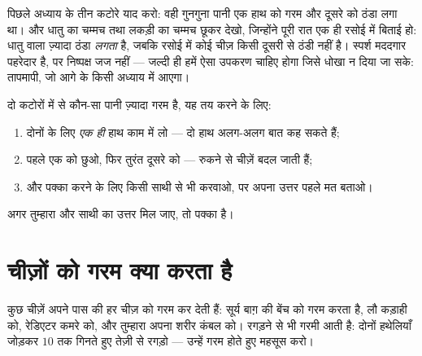 \begin{remark}[स्पर्श धोखा खा सकता है]\label{rem:g1:hot-and-cold:fooled}
पिछले अध्याय के तीन कटोरे याद करो: वही गुनगुना पानी एक हाथ को गरम और
दूसरे को ठंडा लगा था। और धातु का चम्मच तथा लकड़ी का चम्मच छूकर देखो,
जिन्होंने पूरी रात एक ही रसोई में बिताई हो: धातु वाला ज़्यादा ठंडा
\emph{लगता} है, जबकि रसोई में कोई चीज़ किसी दूसरी से ठंडी नहीं है।
स्पर्श मददगार पहरेदार है, पर निष्पक्ष जज नहीं --- जल्दी ही हमें ऐसा
उपकरण चाहिए होगा जिसे धोखा न दिया जा सके: तापमापी, जो आगे के किसी
अध्याय में आएगा।
\end{remark}

\begin{method}[गरम-ठंडे की निष्पक्ष तुलना]\label{met:g1:hot-and-cold:compare}
दो कटोरों में से कौन-सा पानी ज़्यादा गरम है, यह तय करने के लिए:
\begin{enumerate}
  \item दोनों के लिए \emph{एक ही} हाथ काम में लो --- दो हाथ अलग-अलग
        बात कह सकते हैं;
  \item पहले एक को छुओ, फिर तुरंत दूसरे को --- रुकने से चीज़ें बदल
        जाती हैं;
  \item और पक्का करने के लिए किसी साथी से भी करवाओ, पर अपना उत्तर
        पहले मत बताओ।
\end{enumerate}
अगर तुम्हारा और साथी का उत्तर मिल जाए, तो  पक्का है।
\end{method}

\section{चीज़ों को गरम क्या करता है}

\begin{example}\label{ex:g1:hot-and-cold:warmers}
कुछ चीज़ें अपने पास की हर चीज़ को गरम कर देती हैं: सूर्य बाग़ की बेंच
को गरम करता है, लौ कड़ाही को, रेडिएटर कमरे को, और तुम्हारा अपना शरीर
कंबल को। रगड़ने से भी गरमी आती है: दोनों हथेलियाँ जोड़कर $10$ तक
गिनते हुए तेज़ी से रगड़ो --- उन्हें गरम होते हुए महसूस करो।
\end{example}

